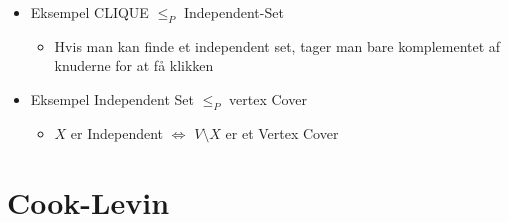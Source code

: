 \begin{itemize}
\begin{itemize}
	      \end{itemize}
	\item Eksempel CLIQUE $\le_{P}$ Independent-Set
	      \begin{itemize}
		      \item Hvis man kan finde et independent set, tager man bare komplementet af knuderne for at få klikken
	      \end{itemize}
	\item Eksempel Independent Set $\le_{P}$ vertex Cover
	      \begin{itemize}
		      \item $X$ er Independent $\iff$ $V \setminus X$ er et Vertex Cover
	      \end{itemize}
\end{itemize}

\section*{Cook-Levin}

